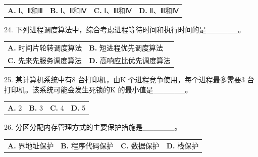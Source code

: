 \documentclass[UTF8,11pt]{ctexart}
\begin{document}
\begin{center}\begin{tabular}{>{\raggedright\arraybackslash}p{\dimexpr(\linewidth-8\tabcolsep)/4\relax}>{\raggedright\arraybackslash}p{\dimexpr(\linewidth-8\tabcolsep)/4\relax}>{\raggedright\arraybackslash}p{\dimexpr(\linewidth-8\tabcolsep)/4\relax}>{\raggedright\arraybackslash}p{\dimexpr(\linewidth-8\tabcolsep)/4\relax}}
\textbf{A.} Ⅰ、Ⅱ和Ⅲ & \textbf{B.} Ⅰ、Ⅱ和Ⅳ & \textbf{C.} Ⅰ、Ⅲ和Ⅳ & \textbf{D.} Ⅱ、Ⅲ和Ⅳ\\[.35em]\end{tabular}\end{center}

24. 下列进程调度算法中，综合考虑进程等待时间和执行时间的是\_\_\_\_\_\_。


\begin{center}\begin{tabular}{>{\raggedright\arraybackslash}p{\dimexpr(\linewidth-4\tabcolsep)/2\relax}>{\raggedright\arraybackslash}p{\dimexpr(\linewidth-4\tabcolsep)/2\relax}}
\textbf{A.} 时间片轮转调度算法 & \textbf{B.} 短进程优先调度算法\\[.35em]
\textbf{C.} 先来先服务调度算法 & \textbf{D.} 高响应比优先调度算法\\[.35em]\end{tabular}\end{center}

25. 某计算机系统中有8 台打印机，由K 个进程竞争使用，每个进程最多需要3 台打印机。该系统可能会发生死锁的K 的最小值是\_\_\_\_\_\_。


\begin{center}\begin{tabular}{>{\raggedright\arraybackslash}p{\dimexpr(\linewidth-8\tabcolsep)/4\relax}>{\raggedright\arraybackslash}p{\dimexpr(\linewidth-8\tabcolsep)/4\relax}>{\raggedright\arraybackslash}p{\dimexpr(\linewidth-8\tabcolsep)/4\relax}>{\raggedright\arraybackslash}p{\dimexpr(\linewidth-8\tabcolsep)/4\relax}}
\textbf{A.} 2 & \textbf{B.} 3 & \textbf{C.} 4 & \textbf{D.} 5\\[.35em]\end{tabular}\end{center}

26. 分区分配内存管理方式的主要保护措施是\_\_\_\_\_\_。


\begin{center}\begin{tabular}{>{\raggedright\arraybackslash}p{\dimexpr(\linewidth-8\tabcolsep)/4\relax}>{\raggedright\arraybackslash}p{\dimexpr(\linewidth-8\tabcolsep)/4\relax}>{\raggedright\arraybackslash}p{\dimexpr(\linewidth-8\tabcolsep)/4\relax}>{\raggedright\arraybackslash}p{\dimexpr(\linewidth-8\tabcolsep)/4\relax}}
\textbf{A.} 界地址保护 & \textbf{B.} 程序代码保护 & \textbf{C.} 数据保护 & \textbf{D.} 栈保护\\[.35em]\end{tabular}\end{center}
\end{document}
